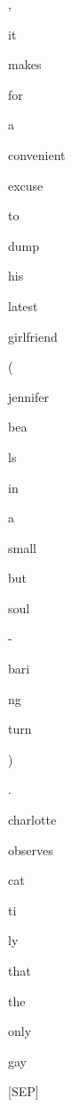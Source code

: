 \documentclass[varwidth=150mm]{standalone}
\begin{document}
\begin{CJK*}{UTF8}{gbsn}
{{{\colorbox{red!0.0}{\strut ,} \colorbox{red!1.3425782918930054}{\strut it} \colorbox{red!0.0}{\strut makes} \colorbox{red!1.8846393823623657}{\strut for} \colorbox{red!1.3067131042480469}{\strut a} \colorbox{red!1.195467233657837}{\strut convenient} \colorbox{red!0.0}{\strut excuse} \colorbox{red!2.0200624465942383}{\strut to} \colorbox{red!0.0}{\strut dump} \colorbox{red!0.0}{\strut his} \colorbox{red!1.8200680017471313}{\strut latest} \colorbox{red!0.0}{\strut girlfriend} \colorbox{red!3.1041526794433594}{\strut (} \colorbox{red!1.6814714670181274}{\strut jennifer} \colorbox{red!2.6796176433563232}{\strut bea}\colorbox{red!1.6273491382598877}{\strut ls} \colorbox{red!1.7968961000442505}{\strut in} \colorbox{red!1.1244419813156128}{\strut a} \colorbox{red!0.0}{\strut small} \colorbox{red!1.3189173936843872}{\strut but} \colorbox{red!1.1091328859329224}{\strut soul} \colorbox{red!0.0}{\strut -} \colorbox{red!0.0}{\strut bari}\colorbox{red!2.6715335845947266}{\strut ng} \colorbox{red!1.3570841550827026}{\strut turn} \colorbox{red!2.2168309688568115}{\strut )} \colorbox{red!0.0}{\strut .} \colorbox{red!99.99999237060547}{\strut charlotte} \colorbox{red!7.868648052215576}{\strut observes} \colorbox{red!4.452361106872559}{\strut cat}\colorbox{red!12.086913108825684}{\strut ti}\colorbox{red!4.69632625579834}{\strut ly} \colorbox{red!9.816449165344238}{\strut that} \colorbox{red!3.8066928386688232}{\strut the} \colorbox{red!1.1587649583816528}{\strut only} \colorbox{red!13.235898971557617}{\strut gay} \colorbox{red!11.787994384765625}{\strut [SEP]}
}}}
\end{CJK*}
\end{document}
